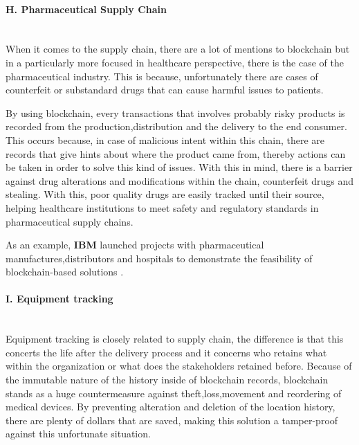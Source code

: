 \paragraph{H. Pharmaceutical Supply Chain} \mbox{}\\
When it comes to the supply chain, there are a lot of mentions to blockchain but in a particularly more focused in healthcare perspective, there is the case of the pharmaceutical industry. This is because, unfortunately there are cases of counterfeit or substandard drugs that can cause harmful issues to patients.

By using blockchain, every transactions that involves probably risky products is recorded from the production,distribution and the delivery to the end consumer. This occurs because, in case of malicious intent within this chain, there are records that give hints about where the product came from, thereby actions can be taken in order to solve this kind of issues. With this in mind, there is a barrier against drug alterations and modifications within the chain, counterfeit drugs and stealing. With this, poor quality drugs are easily tracked until their source, helping healthcare institutions to meet safety and regulatory standards in pharmaceutical supply chains.

As an example, \textbf{IBM} launched projects with pharmaceutical manufactures,distributors and hospitals to demonstrate the feasibility of blockchain-based solutions \cite{blockchain-implementation-review-conceptual}. 

\paragraph{I. Equipment tracking}  \mbox{}\\
Equipment tracking is closely related to supply chain, the difference is that this concerts the life after the delivery process and it concerns who retains what within the organization or what does the stakeholders retained before. Because of the immutable nature of the history inside of blockchain records, blockchain stands as a huge countermeasure against theft,loss,movement and reordering of medical devices. By preventing alteration and deletion of the location history, there are plenty of dollars that are saved, making this solution a tamper-proof against this unfortunate situation.

